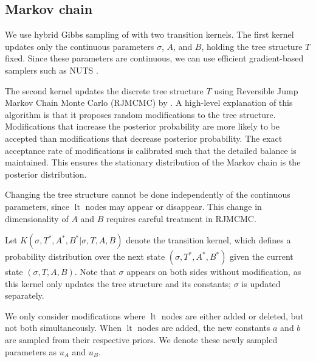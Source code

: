 \documentclass{ifacconf}
\DeclareMathOperator{\lt}{lt}
\begin{document}
	\subsection{Markov chain}
	We use hybrid Gibbs sampling of \citet{tierney} with two transition kernels.
	The first kernel updates only the continuous parameters $\sigma$, $A$, and $B$, holding the tree structure $T$ fixed.
	Since these parameters are continuous, we can use efficient gradient-based samplers such as NUTS \citep{hoffman}.
	
	The second kernel updates the discrete tree structure $T$ using Reversible Jump Markov Chain Monte Carlo (RJMCMC) by \citet{green}.
	A high-level explanation of this algorithm is that it proposes random modifications to the tree structure.
	Modifications that increase the posterior probability are more likely to be accepted than modifications that decrease posterior probability. The exact acceptance rate of modifications is calibrated such that the detailed balance is maintained.
	This ensures the stationary distribution of the Markov chain is the posterior distribution.
	
	Changing the tree structure cannot be done independently of the continuous parameters, since $\lt$ nodes may appear or disappear.
	This change in dimensionality of $A$ and $B$ requires careful treatment in RJMCMC.
	
	
	Let $K(\sigma, T^*, A^*, B^* | \sigma, T, A, B)$ denote the transition kernel, which defines a probability distribution over the next state $(\sigma, T^*, A^*, B^*)$ given the current state $(\sigma, T, A, B)$.
	Note that $\sigma$ appears on both sides without modification, as this kernel only updates the tree structure and its constants; $\sigma$ is updated separately.
	
	We only consider modifications where $\lt$ nodes are either added or deleted, but not both simultaneously.
	When $\lt$ nodes are added, the new constants $a$ and $b$ are sampled from their respective priors.
	We denote these newly sampled parameters as $u_A$ and $u_B$.
	
\end{document}
